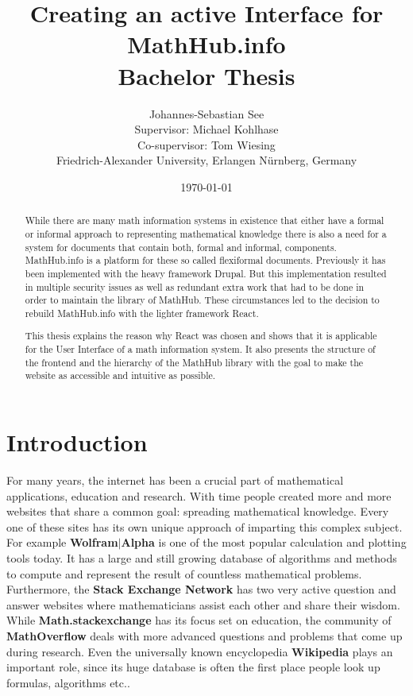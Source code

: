 \documentclass[11pt,a4paper]{article}
\title{Creating an active Interface for MathHub.info\\ \vspace{2 mm} Bachelor Thesis}
\author{Johannes-Sebastian See\\Supervisor: Michael Kohlhase\\Co-supervisor: Tom Wiesing\\Friedrich-Alexander University, Erlangen Nürnberg, Germany}
\date{\today}
\begin{document}
\begin{titlepage}
\maketitle
\begin{abstract}
While there are many math information systems in existence that either have a formal or informal approach to representing mathematical knowledge there is also a need for a system for documents that contain both, formal and informal, components.
MathHub.info is a platform for these so called flexiformal documents.
Previously it has been implemented with the heavy framework Drupal.
But this implementation resulted in multiple security issues as well as redundant extra work that had to be done in order to maintain the library of MathHub.
These circumstances led to the decision to rebuild MathHub.info with the lighter framework React.

This thesis explains the reason why React was chosen and shows that it is applicable for the User Interface of a math information system.
It also presents the structure of the frontend and the hierarchy of the MathHub library with the goal to make the website as accessible and intuitive as possible.

\end{abstract}

\end{titlepage}

\tableofcontents
\pagebreak
\section{Introduction}
For many years, the internet has been a crucial part of mathematical applications, education and research. 
With time people created more and more websites that share a common goal: spreading mathematical knowledge.
Every one of these sites has its own unique approach of imparting this complex subject.
For example \textbf{Wolfram$|$Alpha} \cite{wolfram} is one of the most popular calculation and plotting tools today.
It has a large and still growing database of algorithms and methods to compute and represent the result of countless mathematical problems.
Furthermore, the \textbf{Stack Exchange Network} has two very active question and answer websites where mathematicians assist each other and share their wisdom.
While \textbf{Math.stackexchange} has its focus set on education, the community of \textbf{MathOverflow} deals with more advanced questions and problems that come up during research.
Even the universally known encyclopedia \textbf{Wikipedia} plays an important role, since its huge database is often the first place people look up formulas, algorithms etc..
\end{document}
